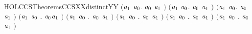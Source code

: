 \begin{SaveVerbatim}{HOLCCSTheoremsCCSXXdistinctYY}
   \ensuremath{(}\HOLSymConst{\HOLTokenForall{}}\ensuremath{\HOLBoundVar{a}\sb{\mathrm{1}}} \ensuremath{\HOLBoundVar{a}\sb{\mathrm{0}}}.  \ensuremath{\HOLBoundVar{a}\sb{\mathrm{0}}} \ensuremath{\HOLBoundVar{a}\sb{\mathrm{1}}} \HOLSymConst{\HOLTokenNotEqual{}} \ensuremath{)} \HOLSymConst{\HOLTokenConj{}} \ensuremath{(}\HOLSymConst{\HOLTokenForall{}}\ensuremath{\HOLBoundVar{a}\sb{\mathrm{1}}} \ensuremath{\HOLBoundVar{a}\sb{\mathrm{0}}}.  \ensuremath{\HOLBoundVar{a}\sb{\mathrm{0}}} \ensuremath{\HOLBoundVar{a}\sb{\mathrm{1}}} \HOLSymConst{\HOLTokenNotEqual{}} \ensuremath{)} \HOLSymConst{\HOLTokenConj{}}
   \ensuremath{(}\HOLSymConst{\HOLTokenForall{}}\ensuremath{\HOLBoundVar{a}\sb{\mathrm{1}}} \ensuremath{\HOLBoundVar{a}\sb{\mathrm{0}}}.  \ensuremath{\HOLBoundVar{a}\sb{\mathrm{0}}} \ensuremath{\HOLBoundVar{a}\sb{\mathrm{1}}} \HOLSymConst{\HOLTokenNotEqual{}} \ensuremath{)} \HOLSymConst{\HOLTokenConj{}} \ensuremath{(}\HOLSymConst{\HOLTokenForall{}}\ensuremath{\HOLBoundVar{a}\sb{\mathrm{1}}} \ensuremath{\HOLBoundVar{a}\sb{\mathrm{0}}} . \ensuremath{\HOLBoundVar{a}\sb{\mathrm{0}}}\HOLSymConst{\ensuremath{\ldotp}}\ensuremath{\HOLBoundVar{a}\sb{\mathrm{1}}} \HOLSymConst{\HOLTokenNotEqual{}}  \ensuremath{)} \HOLSymConst{\HOLTokenConj{}}
   \ensuremath{(}\HOLSymConst{\HOLTokenForall{}}\ensuremath{\HOLBoundVar{a}\sb{\mathrm{1}}} \ensuremath{\HOLBoundVar{a}\sb{\mathrm{0}}} . \ensuremath{\HOLBoundVar{a}\sb{\mathrm{0}}} \HOLSymConst{\ensuremath{+}} \ensuremath{\HOLBoundVar{a}\sb{\mathrm{1}}} \HOLSymConst{\HOLTokenNotEqual{}}  \ensuremath{)} \HOLSymConst{\HOLTokenConj{}} \ensuremath{(}\HOLSymConst{\HOLTokenForall{}}\ensuremath{\HOLBoundVar{a}\sb{\mathrm{1}}} \ensuremath{\HOLBoundVar{a}\sb{\mathrm{0}}} . \ensuremath{\HOLBoundVar{a}\sb{\mathrm{0}}} \HOLSymConst{\ensuremath{\mid}} \ensuremath{\HOLBoundVar{a}\sb{\mathrm{1}}} \HOLSymConst{\HOLTokenNotEqual{}}  \ensuremath{)} \HOLSymConst{\HOLTokenConj{}}
   \ensuremath{(}\HOLSymConst{\HOLTokenForall{}}\ensuremath{\HOLBoundVar{a}\sb{\mathrm{1}}} \ensuremath{\HOLBoundVar{a}\sb{\mathrm{0}}} .  \ensuremath{\HOLBoundVar{a}\sb{\mathrm{0}}} \ensuremath{\HOLBoundVar{a}\sb{\mathrm{1}}} \HOLSymConst{\HOLTokenNotEqual{}}  \ensuremath{)} \HOLSymConst{\HOLTokenConj{}}
   \ensuremath{(}\HOLSymConst{\HOLTokenForall{}}\ensuremath{\HOLBoundVar{a}\sb{\mathrm{1}}} \ensuremath{\HOLBoundVar{a}\sb{\mathrm{0}}} .  \ensuremath{\HOLBoundVar{a}\sb{\mathrm{0}}} \ensuremath{\HOLBoundVar{a}\sb{\mathrm{1}}} \HOLSymConst{\HOLTokenNotEqual{}}  \ensuremath{)} \HOLSymConst{\HOLTokenConj{}}

\end{SaveVerbatim}
